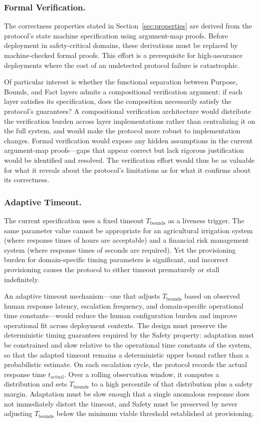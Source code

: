 \subsubsection{Formal Verification.}
The correctness properties stated in Section~\ref{sec:properties} are derived from the protocol's state machine specification using argument-map proofs. Before deployment in safety-critical domains, these derivations must be replaced by machine-checked formal proofs. This effort is a prerequisite for high-assurance deployments where the cost of an undetected protocol failure is catastrophic.

Of particular interest is whether the functional separation between Purpose, Bounds, and Fact layers admits a compositional verification argument: if each layer satisfies its specification, does the composition necessarily satisfy the protocol's guarantees? A compositional verification architecture would distribute the verification burden across layer implementations rather than centralizing it on the full system, and would make the protocol more robust to implementation changes. Formal verification would expose any hidden assumptions in the current argument-map proofs---gaps that appear correct but lack rigorous justification would be identified and resolved. The verification effort would thus be as valuable for what it reveals about the protocol's limitations as for what it confirms about its correctness.

\subsubsection{Adaptive Timeout.}
The current specification uses a fixed timeout $T_{\text{bounds}}$ as a liveness trigger. The same parameter value cannot be appropriate for an agricultural irrigation system (where response times of hours are acceptable) and a financial risk management system (where response times of seconds are required). Yet the provisioning burden for domain-specific timing parameters is significant, and incorrect provisioning causes the protocol to either timeout prematurely or stall indefinitely.

An adaptive timeout mechanism---one that adjusts $T_{\text{bounds}}$ based on observed human response latency, escalation frequency, and domain-specific operational time constants---would reduce the human configuration burden and improve operational fit across deployment contexts. The design must preserve the deterministic timing guarantees required by the Safety property: adaptation must be constrained and slow relative to the operational time constants of the system, so that the adapted timeout remains a deterministic upper bound rather than a probabilistic estimate. On each escalation cycle, the protocol records the actual response time $t_{\text{actual}}$. Over a rolling observation window, it computes a distribution and sets $T_{\text{bounds}}$ to a high percentile of that distribution plus a safety margin. Adaptation must be slow enough that a single anomalous response does not immediately distort the timeout, and Safety must be preserved by never adjusting $T_{\text{bounds}}$ below the minimum viable threshold established at provisioning.

